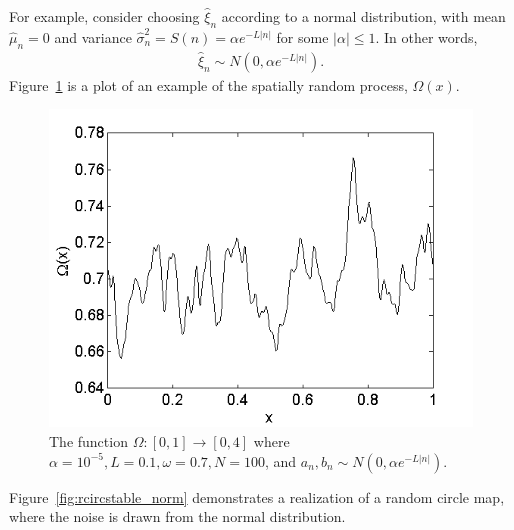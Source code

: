 For example, consider choosing $\hat{\xi}_n$ according to a normal
distribution, with mean $\hat{\mu}_n=0$ and variance $\hat{\sigma}_n^2 =
S(n) = \alpha e^{-L|n|}$ for some $|\alpha| \leq 1$. In other words, 
\begin{align}\label{eq:norm}
\hat{\xi}_n\sim N(0,\alpha e^{-L|n|}). 
\end{align}
Figure~\ref{fig:Omega} is a plot of an example of the spatially random process,
$\Omega(x)$.
\begin{figure}[htp]
\caption[The function $\Omega(x)$]{The function $\Omega:[0,1]\to [0,4]$ where
  $\alpha=10^{-5}, L=0.1, \omega=0.7, N=100$, and $a_n,b_n\sim N(0,\alpha e^{-L|n|})$.
  }\label{fig:Omega}
\centering
\includegraphics[scale=0.65]{figs/Omega.png}
\end{figure}
Figure~\ref{fig:rcircstable_norm} demonstrates a realization of a random circle
map, where the noise is drawn from the normal distribution.
